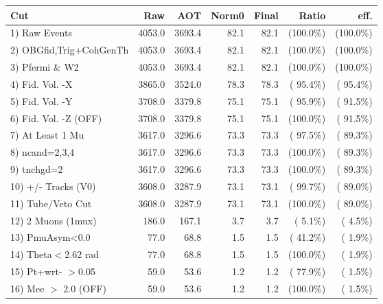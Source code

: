  \begin{table}[h!]\centering
 \begin{tabular}{||l||r|r|r|r|r|r||}
 \hline
 \hline
 Cut & Raw & AOT & Norm0 & Final & Ratio & eff.       \\
 \hline
  1) Raw Events           &       4053.0 &       3693.4 &         82.1 &         82.1 & (100.0\%) & (100.0\%) \\
  2) OBGfid,Trig+CohGenTh &       4053.0 &       3693.4 &         82.1 &         82.1 & (100.0\%) & (100.0\%) \\
  3) Pfermi \& W2         &       4053.0 &       3693.4 &         82.1 &         82.1 & (100.0\%) & (100.0\%) \\
  4) Fid. Vol. -X         &       3865.0 &       3524.0 &         78.3 &         78.3 & ( 95.4\%) & ( 95.4\%) \\
  5) Fid. Vol. -Y         &       3708.0 &       3379.8 &         75.1 &         75.1 & ( 95.9\%) & ( 91.5\%) \\
  6) Fid. Vol. -Z (OFF)   &       3708.0 &       3379.8 &         75.1 &         75.1 & (100.0\%) & ( 91.5\%) \\
  7) At Least 1 Mu        &       3617.0 &       3296.6 &         73.3 &         73.3 & ( 97.5\%) & ( 89.3\%) \\
  8) ncand=2,3,4          &       3617.0 &       3296.6 &         73.3 &         73.3 & (100.0\%) & ( 89.3\%) \\
  9) tnchgd=2             &       3617.0 &       3296.6 &         73.3 &         73.3 & (100.0\%) & ( 89.3\%) \\
 10) +/- Tracks (V0)      &       3608.0 &       3287.9 &         73.1 &         73.1 & ( 99.7\%) & ( 89.0\%) \\
 11) Tube/Veto Cut        &       3608.0 &       3287.9 &         73.1 &         73.1 & (100.0\%) & ( 89.0\%) \\
 12) 2 Muons (1mux)       &        186.0 &        167.1 &          3.7 &          3.7 & (  5.1\%) & (  4.5\%) \\
 13) PmuAsym<0.0          &         77.0 &         68.8 &          1.5 &          1.5 & ( 41.2\%) & (  1.9\%) \\
 14) Theta$<$2.62 rad     &         77.0 &         68.8 &          1.5 &          1.5 & (100.0\%) & (  1.9\%) \\
 15) Pt+wrt- $>$0.05      &         59.0 &         53.6 &          1.2 &          1.2 & ( 77.9\%) & (  1.5\%) \\
 16) Mee $>$ 2.0  (OFF)   &         59.0 &         53.6 &          1.2 &          1.2 & (100.0\%) & (  1.5\%) \\

\end{tabular}
\end{table}
